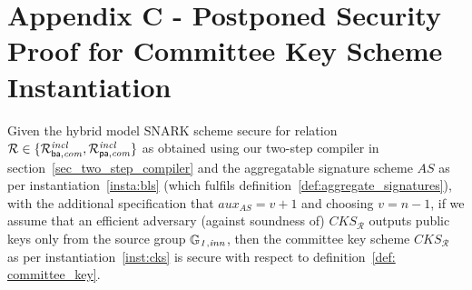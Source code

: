  \section{Appendix C - Postponed Security Proof for Committee Key Scheme Instantiation}
\label{sec:proof_sec_cks}

\begin{theorem} Given the hybrid model SNARK scheme secure for relation $\mathcal{R} \in \{ \mathcal{R}^{\mathit{incl}}_{\mathsf{ba},\mathit{com}}, \mathcal{R}^{\mathit{incl}}_{\mathsf{pa},\mathit{com}}\}$ as 
obtained using our two-step compiler in section~\ref{sec_two_step_compiler} and the aggregatable signature scheme $\mathit{AS}$ 
                     as per instantiation~\ref{insta:bls} (which fulfils definition~\ref{def:aggregate_signatures}), with the additional 
                     specification that $\mathit{aux}_{\mathit{AS}} = v+1$ and choosing $v = n-1$, 
if we assume that an efficient adversary (against soundness of) $\mathit{CKS}_{\mathcal{R}}$ outputs public keys only from the source group $\mathbb{G}_{\mathit{1,inn}}$,  
then the committee key scheme $\mathit{CKS}_{\mathcal{R}}$ as per instantiation~\ref{inst:cks} is secure with respect to definition~\ref{def: committee_key}. 
\end{theorem}

